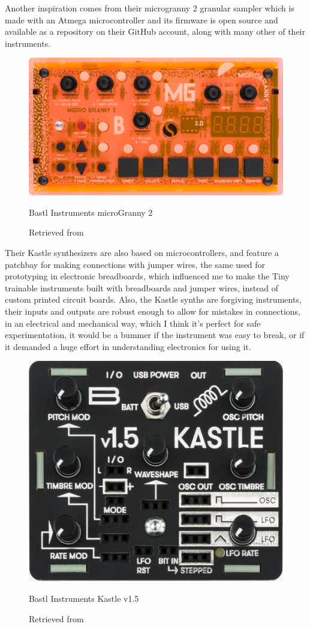 Another inspiration comes from their microgranny 2 granular sampler which is made with an Atmega microcontroller and its firmware is open source and available as a repository on their GitHub account, along with many other of their instruments.

\begin{figure}[ht]
  \centering
  \includegraphics[width=0.75\linewidth,height=0.25\textheight,keepaspectratio]{images/bastl-microgranny-2.jpg}
  \caption{Bastl Instruments microGranny 2}
  \caption*{Retrieved from \cite{website-bastl-instruments-current}}
  \label{fig:bastl-microgranny-2}
\end{figure}

Their Kastle synthesizers are also based on microcontrollers, and feature a patchbay for making connections with jumper wires, the same used for prototyping in electronic breadboards, which influenced me to make the Tiny trainable instruments built with breadboards and jumper wires, instead of custom printed circuit boards. Also, the Kastle synths are forgiving instruments, their inputs and outputs are robust enough to allow for mistakes in connections, in an electrical and mechanical way, which I think it's perfect for safe experimentation, it would be a bummer if the instrument was easy to break, or if it demanded a huge effort in understanding electronics for using it.

\begin{figure}[ht]
  \centering
  \includegraphics[width=0.75\linewidth,height=0.25\textheight,keepaspectratio]{images/bastl-kastle-v15.jpg}
  \caption{Bastl Instruments Kastle v1.5}
  \caption*{Retrieved from \cite{website-bastl-instruments-current}}
  \label{fig:bastl-kastle-v15}
\end{figure}

